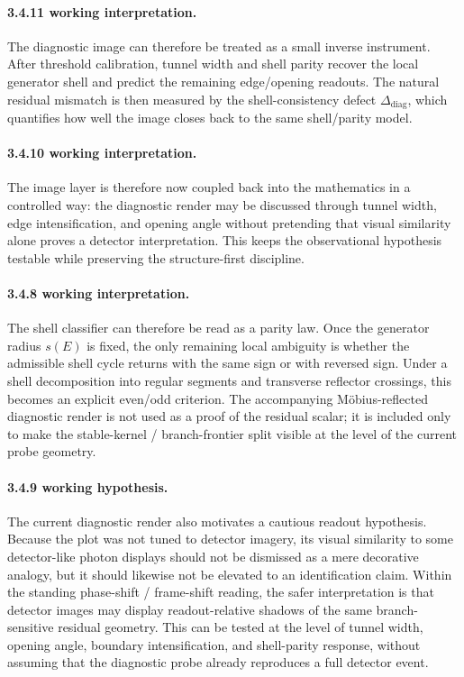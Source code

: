 \paragraph{3.4.11 working interpretation.}
The diagnostic image can therefore be treated as a small inverse instrument. After threshold calibration, tunnel width and shell parity recover the local generator shell and predict the remaining edge/opening readouts. The natural residual mismatch is then measured by the shell-consistency defect $\Delta_{\mathrm{diag}}$, which quantifies how well the image closes back to the same shell/parity model.

\paragraph{3.4.10 working interpretation.}
The image layer is therefore now coupled back into the mathematics in a controlled way: the diagnostic render may be discussed through tunnel width, edge intensification, and opening angle without pretending that visual similarity alone proves a detector interpretation. This keeps the observational hypothesis testable while preserving the structure-first discipline.

\paragraph{3.4.8 working interpretation.}
The shell classifier can therefore be read as a parity law. Once the generator radius $s(E)$ is fixed, the only remaining local ambiguity is whether the admissible shell cycle returns with the same sign or with reversed sign. Under a shell decomposition into regular segments and transverse reflector crossings, this becomes an explicit even/odd criterion. The accompanying M\"obius-reflected diagnostic render is not used as a proof of the residual scalar; it is included only to make the stable-kernel / branch-frontier split visible at the level of the current probe geometry.


\paragraph{3.4.9 working hypothesis.}
The current diagnostic render also motivates a cautious readout hypothesis. Because the plot was not tuned to detector imagery, its visual similarity to some detector-like photon displays should not be dismissed as a mere decorative analogy, but it should likewise not be elevated to an identification claim. Within the standing phase-shift / frame-shift reading, the safer interpretation is that detector images may display readout-relative shadows of the same branch-sensitive residual geometry. This can be tested at the level of tunnel width, opening angle, boundary intensification, and shell-parity response, without assuming that the diagnostic probe already reproduces a full detector event.

